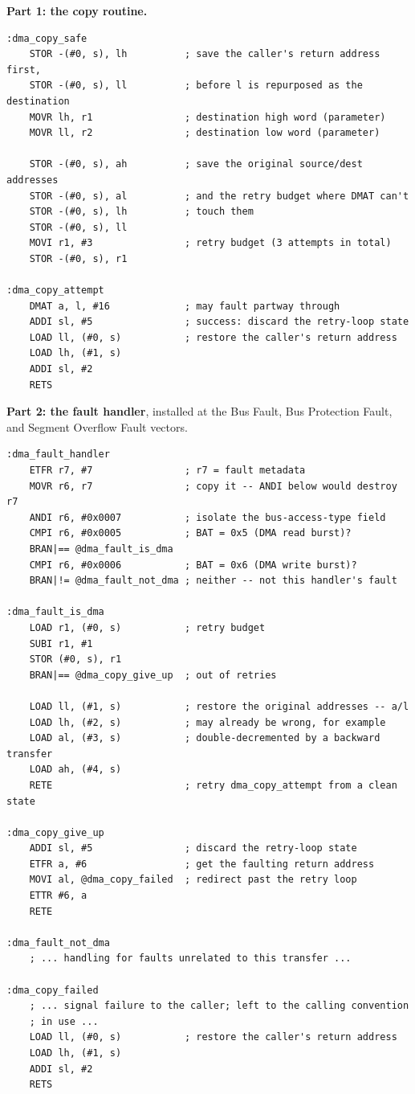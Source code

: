 \begin{example}
	\textbf{Part 1: the copy routine.}

	\begin{lstlisting}[basicstyle=\ttfamily\footnotesize]
:dma_copy_safe
    STOR -(#0, s), lh          ; save the caller's return address first,
    STOR -(#0, s), ll          ; before l is repurposed as the destination
    MOVR lh, r1                ; destination high word (parameter)
    MOVR ll, r2                ; destination low word (parameter)

    STOR -(#0, s), ah          ; save the original source/dest addresses
    STOR -(#0, s), al          ; and the retry budget where DMAT can't
    STOR -(#0, s), lh          ; touch them
    STOR -(#0, s), ll
    MOVI r1, #3                ; retry budget (3 attempts in total)
    STOR -(#0, s), r1

:dma_copy_attempt
    DMAT a, l, #16             ; may fault partway through
    ADDI sl, #5                ; success: discard the retry-loop state
    LOAD ll, (#0, s)           ; restore the caller's return address
    LOAD lh, (#1, s)
    ADDI sl, #2
    RETS
	\end{lstlisting}

	\textbf{Part 2: the fault handler}, installed at the Bus Fault, Bus Protection Fault, and Segment Overflow
	Fault vectors.

	\begin{lstlisting}[basicstyle=\ttfamily\scriptsize]
:dma_fault_handler
    ETFR r7, #7                ; r7 = fault metadata
    MOVR r6, r7                ; copy it -- ANDI below would destroy r7
    ANDI r6, #0x0007           ; isolate the bus-access-type field
    CMPI r6, #0x0005           ; BAT = 0x5 (DMA read burst)?
    BRAN|== @dma_fault_is_dma
    CMPI r6, #0x0006           ; BAT = 0x6 (DMA write burst)?
    BRAN|!= @dma_fault_not_dma ; neither -- not this handler's fault

:dma_fault_is_dma
    LOAD r1, (#0, s)           ; retry budget
    SUBI r1, #1
    STOR (#0, s), r1
    BRAN|== @dma_copy_give_up  ; out of retries

    LOAD ll, (#1, s)           ; restore the original addresses -- a/l
    LOAD lh, (#2, s)           ; may already be wrong, for example
    LOAD al, (#3, s)           ; double-decremented by a backward transfer
    LOAD ah, (#4, s)
    RETE                       ; retry dma_copy_attempt from a clean state

:dma_copy_give_up
    ADDI sl, #5                ; discard the retry-loop state
    ETFR a, #6                 ; get the faulting return address
    MOVI al, @dma_copy_failed  ; redirect past the retry loop
    ETTR #6, a
    RETE

:dma_fault_not_dma
    ; ... handling for faults unrelated to this transfer ...

:dma_copy_failed
    ; ... signal failure to the caller; left to the calling convention
    ; in use ...
    LOAD ll, (#0, s)           ; restore the caller's return address
    LOAD lh, (#1, s)
    ADDI sl, #2
    RETS
	\end{lstlisting}
	\caption{A Retry-Safe DMA Copy Routine}
	\label{ex:dma-copy-safe}
\end{example}

